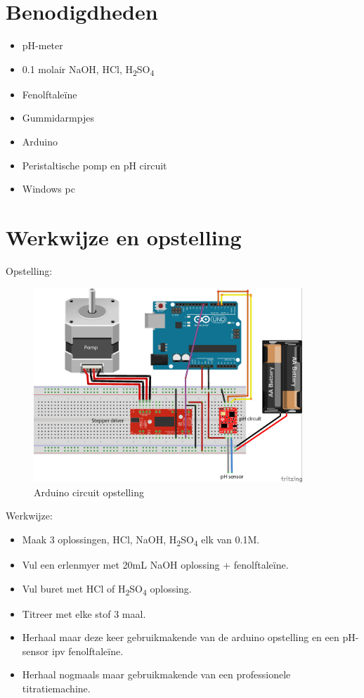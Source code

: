 \documentclass[10pt,twoside]{report}
\begin{document}
\section{Benodigdheden}
\begin{itemize}
    \item pH-meter
    \item 0.1 molair NaOH, HCl, H\textsubscript{2}SO\textsubscript{4}
    \item Fenolftaleïne
    \item Gummidarmpjes
    \item Arduino
    \item Peristaltische pomp en pH circuit
    \item Windows pc
\end{itemize}

\newpage

\section{Werkwijze en opstelling}
Opstelling:
\begin{figure}[H]
    \centering
    \includegraphics[width=0.9\textwidth]{opstelling.jpg}
    \caption{Arduino circuit opstelling}
\end{figure}
Werkwijze:
\begin{itemize}
    \item Maak 3 oplossingen, HCl, NaOH, H\textsubscript{2}SO\textsubscript{4} elk van 0.1M.
    \item Vul een erlenmyer met 20mL NaOH oplossing + fenolftaleïne.
    \item Vul buret met HCl of H\textsubscript{2}SO\textsubscript{4} oplossing.
    \item Titreer met elke stof 3 maal.
    \item Herhaal maar deze keer gebruikmakende van de arduino opstelling en een pH-sensor ipv fenolftaleïne.
    \item Herhaal nogmaals maar gebruikmakende van een professionele titratiemachine.
\end{itemize}
\end{document}
